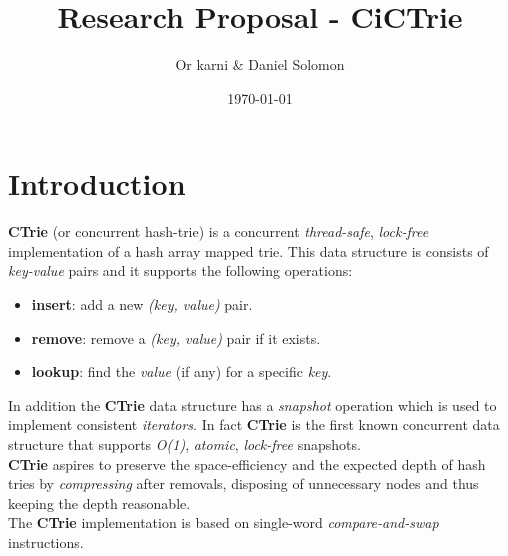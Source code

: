 \documentclass[dvips,12pt]{article}
\begin{document}
	
	\title{Research Proposal - CiCTrie}
	\author{Or karni \& Daniel Solomon}
	\date{\today}
		
	\maketitle
	
	\section{Introduction}
	
		\textbf{CTrie}\cite{article}\cite{wiki-ctrie} (or concurrent hash-trie) is a concurrent \textit{thread-safe}, \textit{lock-free} implementation of a hash array mapped trie. This data structure is consists of \textit{key-value} pairs and it supports the following operations:
		\begin{itemize}
			\item \textbf{insert}: add a new \textit{(key, value)} pair.
			\item \textbf{remove}: remove a \textit{(key, value)} pair if it exists.
			\item \textbf{lookup}: find the \textit{value} (if any) for a specific \textit{key}. 
		\end{itemize}
		In addition the \textbf{CTrie} data structure has a \textit{snapshot} operation which is used to implement consistent \textit{iterators}. In fact \textbf{CTrie} is the first known concurrent data structure that supports \textit{O(1)}, \textit{atomic}, \textit{lock-free} snapshots.\\
		\textbf{CTrie} aspires to preserve the space-efficiency and the expected depth of hash tries by \textit{compressing} after removals, disposing of unnecessary nodes and thus keeping the depth reasonable.\\
		The \textbf{CTrie} implementation is based on single-word \textit{compare-and-swap} instructions. 
 	
\end{document}
